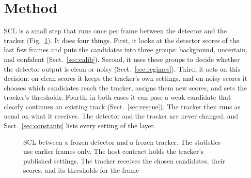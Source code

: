 \documentclass[pdflatex,referee,sn-mathphys-num]{sn-jnl}
\newcommand{\scl}{SCL}
\begin{document}
\section{Method}\label{sec:method}

\scl{} is a small step that runs once per frame between the detector and the
tracker (Fig.~\ref{fig:arch}). It does four things. First, it looks at the
detector scores of the last few frames and puts the candidates into three
groups: background, uncertain, and confident (Sect.~\ref{sec:calib}).
Second, it uses these groups to decide whether the detector output is clean
or noisy (Sect.~\ref{sec:regimes}). Third, it acts on this decision: on
clean scores it keeps the tracker's own settings, and on noisy scores it
chooses which candidates reach the tracker, assigns them new scores, and sets
the tracker's thresholds. Fourth, in both cases it can pass a weak candidate
that clearly continues an existing track (Sect.~\ref{sec:rescue}). The
tracker then runs as usual on what it receives. The detector and the tracker
are never changed, and Sect.~\ref{sec:constants} lists every setting of the
layer.

\begin{figure}[t]
\centering
{}
\caption{\scl{} between a frozen detector
and a frozen tracker. The statistics use earlier frames only. The host
contract holds the tracker's published settings. The tracker receives the
chosen candidates, their scores, and its thresholds for the frame}
\label{fig:arch}
\end{figure}
\end{document}
